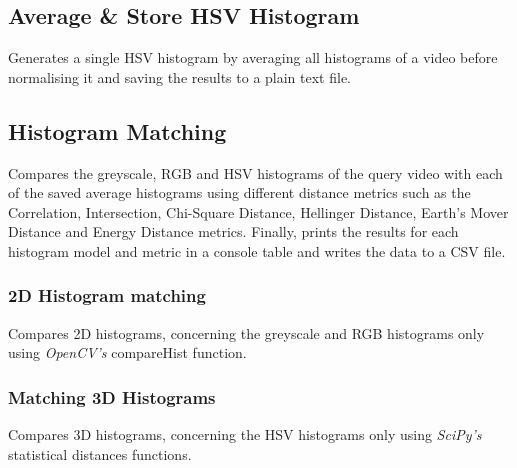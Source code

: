 


\subsection{Average \& Store HSV Histogram}
\label{sec:code-generate_and_store_average_hsv_histogram}

Generates a single HSV histogram by averaging all histograms of a video before normalising it and saving the results to a plain text file.




\subsection{Histogram Matching}
\label{sec:code-histogram-matching-2d-and-3d}

Compares the greyscale, RGB and HSV histograms of the query video with each of the saved average histograms using different distance metrics such as the Correlation, Intersection, Chi-Square Distance, Hellinger Distance, Earth's Mover Distance and Energy Distance metrics. Finally, prints the results for each histogram model and metric in a console table and writes the data to a CSV file.
    
\subsubsection{2D Histogram matching}
\label{sec:code-match_2D_histograms}

Compares 2D histograms, concerning the greyscale and RGB histograms only using \textit{OpenCV's} compareHist function.



\subsubsection{Matching 3D Histograms}
\label{sec:code-match_3D_histograms}

Compares 3D histograms, concerning the HSV histograms only using \textit{SciPy's} statistical distances functions.



